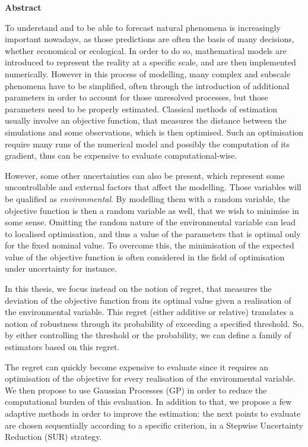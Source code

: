 \vfill

\scriptsize
{}
{}
\begin{center}
 \small \bf Abstract
\end{center}
\vspace{0.3cm}

To understand and to be able to forecast natural phenomena is
increasingly important nowadays, as those predictions are often the
basis of many decisions, whether economical or ecological. In order to
do so, mathematical models are introduced to represent the reality at
a specific scale, and are then implemented numerically. However in
this process of modelling, many complex and subscale phenomena have to
be simplified, often through the introduction of additional parameters
in order to account for those unresolved processes, but those
parameters need to be properly estimated. Classical methods of
estimation usually involve an objective function, that measures the
distance between the simulations and some observations, which is then
optimised. Such an optimisation require many runs of the numerical
model and possibly the computation of its gradient, thus can be
expensive to evaluate computational-wise.

However, some other uncertainties can also be present, which represent
some uncontrollable and external factors that affect the
modelling. Those variables will be qualified as
\emph{environmental}. By modelling them with a random variable, the
objective function is then a random variable as well, that we wish to
minimise in some sense. Omitting the random nature of the
environmental variable can lead to localised optimisation, and thus a
value of the parameters that is optimal only for the fixed nominal
value.  To overcome this, the minimisation of the expected value of
the objective function is often considered in the field of
optimisation under uncertainty for instance.

In this thesis, we focus instead on the notion of regret, that
measures the deviation of the objective function from its optimal
value given a realisation of the environmental variable. This regret
(either additive or relative) translates a notion of robustness
through its probability of exceeding a specified threshold. So, by
either controlling the threshold or the probability, we can define a
family of estimators based on this regret.

The regret can quickly become expensive to evaluate since it requires
an optimisation of the objective for every realisation of the
environmental variable. We then propose to use Gaussian Processes (GP)
in order to reduce the computational burden of this evaluation. In
addition to that, we propose a few adaptive methods in order to
improve the estimation: the next points to evaluate are chosen
sequentially according to a specific criterion, in a Stepwise
Uncertainty Reduction (SUR) strategy.


